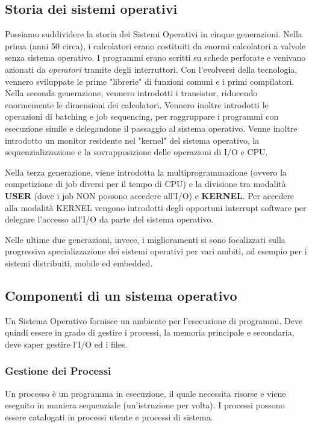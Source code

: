 \documentclass[a4]{article}
\begin{document}
\subsection{Storia dei sistemi operativi}

Possiamo suddividere la storia dei Sistemi Operativi in cinque generazioni. Nella prima (anni 50 circa), i calcolatori erano costituiti da enormi calcolatori a valvole senza sistema operativo. I programmi erano scritti su schede perforate e venivano azionati da \textit{operatori} tramite degli interruttori. Con l'evolversi della tecnologia, vennero sviluppate le prime "librerie" di funzioni comuni e i primi compilatori. Nella seconda generazione, vennero introdotti i transistor, riducendo enormemente le dimensioni dei calcolatori. Vennero inoltre introdotti le operazioni di batching e job sequencing, per raggruppare i programmi con esecuzione simile e delegandone il passaggio al sistema operativo. Venne inoltre introdotto un monitor residente nel "kernel" del sistema operativo, la sequenzializzazione e la sovrapposizione delle operazioni di I/O e CPU.

Nella terza generazione, viene introdotta la multiprogrammazione (ovvero la competizione di job diversi per il tempo di CPU) e la divisione tra modalità \textbf{USER} (dove i job NON possono accedere all'I/O) e \textbf{KERNEL}. Per accedere alla modalità KERNEL vengono introdotti degli opportuni interrupt software per delegare l'accesso all'I/O da parte del sistema operativo.

Nelle ultime due generazioni, invece, i miglioramenti si sono focalizzati sulla progressiva specializzazione dei sistemi operativi per vari ambiti, ad esempio per i sistemi distribuiti, mobile ed embedded.

\subsection{Componenti di un sistema operativo}
Un Sistema Operativo fornisce un ambiente per l'esecuzione di programmi. Deve quindi essere in grado di gestire i processi, la memoria principale e secondaria, deve saper gestire l'I/O ed i files.

\subsubsection{Gestione dei Processi}
Un processo è un programma in esecuzione, il quale necessita risorse e viene eseguito in maniera sequenziale (un'istruzione per volta). I processi possono essere catalogati in processi utente e processi di sistema.
\end{document}
